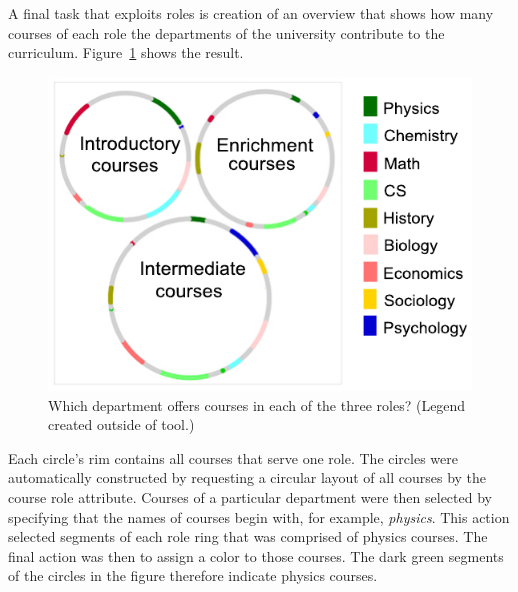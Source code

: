 A final task that exploits roles is creation of an overview that shows
how many courses of each role the departments of the university
contribute to the curriculum. Figure~\ref{fig:rolxCircles} shows the
result.
\begin{figure}
    \centering
    \includegraphics{Figs/rolxRingsCroppedLegendOutside.pdf}
    \caption{Which department offers courses in each of the three
      roles? (Legend created outside of tool.)
    }
    \label{fig:rolxCircles}
\end{figure}
Each circle's rim contains all courses that serve one role. The
circles were automatically constructed by requesting a circular layout
of all courses by the course role attribute. Courses of a particular
department were then selected by specifying that the names of courses
begin with, for example, {\em physics}. This action selected segments
of each role ring that was comprised of physics courses. The final
action was then to assign a color to those courses. The dark green
segments of the circles in the figure therefore indicate physics
courses.

